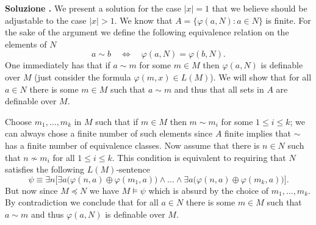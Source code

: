 \documentclass[10pt]{article}
\def\phi{\varphi}
\newcounter{ex}
\newcounter{sol}
\newenvironment{solution}{\addtocounter{sol}{1}\textbf{Soluzione \theex.\quad}}{}
\begin{document}
\begin{solution}
  We present a solution for the case \(|x| = 1\) that we believe should be adjustable to the case \(|x| > 1\).
  We know that \(A = \big\{\phi(a, N)\colon a\in N\big\}\) is finite.
  For the sake of the argument we define the following equivalence relation on the elements of \(N\)
  \[a\sim b\quad\Leftrightarrow\quad \phi(a, N) = \phi(b, N).\]
  One immediately has that if \(a\sim m\) for some \(m\in M\) then \(\phi(a, N)\) is definable over \(M\) (just consider the formula \(\phi(m, x)\in L(M)\)).
  We will show that for all \(a\in N\) there is some \(m\in M\) such that \(a\sim m\) and thus that all sets in \(A\) are definable over \(M\).

  Choose \(m_1,\ldots, m_k\) in \(M\) such that if \(m\in M\) then \(m\sim m_i\) for some \(1\leq i\leq k\); we can always chose a finite number of such elements since \(A\) finite implies that \(\sim\) has a finite number of equivalence classes.
  Now assume that there is \(n\in N\) such that \(n\not\sim m_i\) for all \(1\leq i\leq k\).
  This condition is equivalent to requiring that \(N\) satisfies the following \(L(M)\)-sentence
  \[\psi \equiv \exists n\big[\exists a\big(\phi(n, a)\oplus\phi(m_1, a)\big)\land\ldots\land\exists a\big(\phi(n, a)\oplus\phi(m_k, a)\big)\big].\]
  But now since \(M\preceq N\) we have \(M\models\psi\) which is absurd by the choice of \(m_1,\ldots,m_k\).
  By contradiction we conclude that for all \(a\in N\) there is some \(m\in M\) such that \(a\sim m\) and thus \(\phi(a, N)\) is definable over \(M\).
\end{solution}
\end{document}

